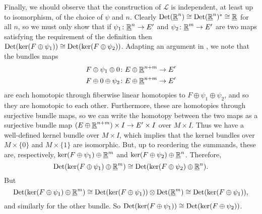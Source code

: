 Finally, we should observe that the construction of $\mathscr L$ is independent, at least up to isomorphism, of the choice of $\psi$ and $n$.
Clearly ${\rm Det}(\underline{\mathbb{R}}^n) \cong {\rm Det}(\underline{\mathbb{R}}^n)^* \cong \underline{\mathbb{R}}$ for all $n$, so we must only show that if $\psi_1 \colon \underline{\mathbb{R}}^n \to E'$ and $\psi_2 \colon \underline{\mathbb{R}}^m \to E'$ are two maps satisfying the requirement of the definition then ${\rm Det}(\ker(F \oplus \psi_1)) \cong {\rm Det}(\ker(F \oplus \psi_2))$.
Adapting an argument in \cite[Section 5.1.3]{DoKr90}, we note that the bundles maps
\begin{align*}
	F \oplus \psi_1 \oplus 0 \colon &E \oplus \underline{\mathbb{R}}^{n+m} \to E'\\
	F \oplus 0 \oplus \psi_2 \colon &E \oplus \underline{\mathbb{R}}^{n+m} \to E'
\end{align*}
are each homotopic through fiberwise linear homotopies to $F \oplus \psi_1 \oplus \psi_2$, and so they are homotopic to each other.
Furthermore, these are homotopies through surjective bundle maps, so we can write the homotopy between the two maps as a surjective bundle map $(E \oplus \underline{\mathbb{R}}^{n+m}) \times I \to E' \times I$ over $M \times I$.
Thus we have a well-defined kernel bundle over $M \times I$, which implies that the kernel bundles over $M \times \{0\}$ and $M \times \{1\}$ are isomorphic.
But, up to reordering the summands, these are, respectively, $\ker(F \oplus \psi_1) \oplus \underline{\mathbb{R}}^m$ and $\ker(F \oplus \psi_2) \oplus \underline{\mathbb{R}}^n$.
Therefore,
$${\rm Det}(\ker(F \oplus \psi_1) \oplus \underline{\mathbb{R}}^m) \cong {\rm Det}(\ker(F \oplus \psi_2) \oplus \underline{\mathbb{R}}^n).$$
But
$${\rm Det}(\ker(F \oplus \psi_1) \oplus \underline{\mathbb{R}}^m) \cong {\rm Det}(\ker(F \oplus \psi_1)) \otimes {\rm Det}(\underline{\mathbb{R}}^m) \cong {\rm Det}(\ker(F \oplus \psi_1)),$$
and similarly for the other bundle.
So ${\rm Det}(\ker(F \oplus \psi_1)) \cong {\rm Det}(\ker(F \oplus \psi_2))$.